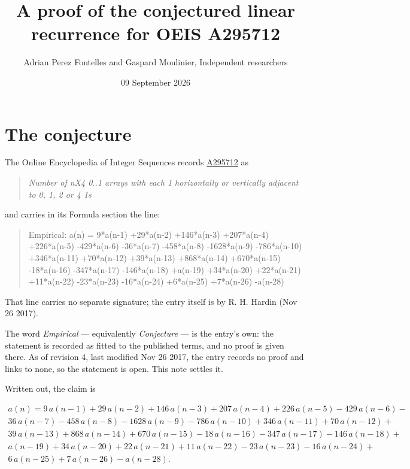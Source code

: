 \documentclass[11pt]{article}
\title{A proof of the conjectured linear recurrence for OEIS A295712}
\author{Adrian Perez Fontelles and Gaspard Moulinier, Independent researchers}
\date{09 September 2026}
\theoremstyle{definition}
\begin{document}
\maketitle
\section{The conjecture}

The Online Encyclopedia of Integer Sequences records \href{https://oeis.org/A295712}{A295712} as

\begin{quote}\itshape Number of nX4 0..1 arrays with each 1 horizontally or vertically adjacent to 0, 1, 2 or 4 1s\end{quote}

and carries in its Formula section the line:

\begin{quote}\ttfamily Empirical: a(n) = 9*a(n-1) +29*a(n-2) +146*a(n-3) +207*a(n-4) +226*a(n-5) -429*a(n-6) -36*a(n-7) -458*a(n-8) -1628*a(n-9) -786*a(n-10) +346*a(n-11) +70*a(n-12) +39*a(n-13) +868*a(n-14) +670*a(n-15) -18*a(n-16) -347*a(n-17) -146*a(n-18) +a(n-19) +34*a(n-20) +22*a(n-21) +11*a(n-22) -23*a(n-23) -16*a(n-24) +6*a(n-25) +7*a(n-26) -a(n-28)\end{quote}

That line carries no separate signature; the entry itself is by R. H. Hardin (Nov 26 2017).

The word {\itshape Empirical} --- equivalently {\itshape Conjecture} --- is the entry's own: the statement is recorded as fitted to the published terms, and no proof is given there. As of revision 4, last modified Nov 26 2017, the entry records no proof and links to none, so the statement is open. This note settles it.

Written out, the claim is

\begin{multline*} a(n) = 9\,a(n-1) + 29\,a(n-2) + 146\,a(n-3) + 207\,a(n-4) + 226\,a(n-5) - 429\,a(n-6) - \\ 36\,a(n-7) - 458\,a(n-8) - 1628\,a(n-9) - 786\,a(n-10) + 346\,a(n-11) + 70\,a(n-12) + \\ 39\,a(n-13) + 868\,a(n-14) + 670\,a(n-15) - 18\,a(n-16) - 347\,a(n-17) - 146\,a(n-18) + \\ a(n-19) + 34\,a(n-20) + 22\,a(n-21) + 11\,a(n-22) - 23\,a(n-23) - 16\,a(n-24) + \\ 6\,a(n-25) + 7\,a(n-26) - a(n-28). \end{multline*}
\end{document}
